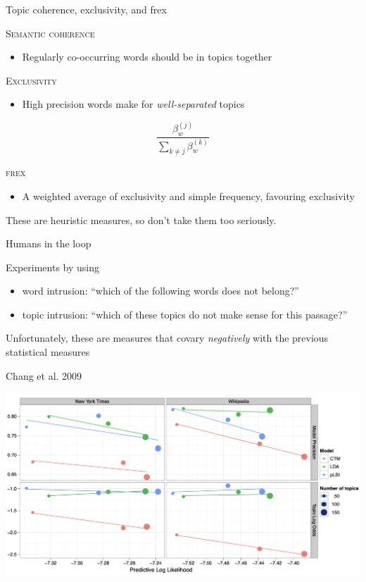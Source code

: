 \documentclass{hertieteaching}
\begin{document}
\begin{frame}{Topic coherence, exclusivity, and frex}

\textsc{Semantic coherence}

\begin{itemize}
  \item Regularly co-occurring words should be in  topics together
\end{itemize}

\textsc{Exclusivity}

\begin{itemize}
  \item High precision words make for \textit{well-separated} topics
\end{itemize}
$$
\frac{\beta_w^{(j)}}{\sum_{k\neq j} \beta_w^{(k)}}
$$

\textsc{frex}
\begin{itemize}
  \item A weighted average of exclusivity and simple frequency, favouring exclusivity
\end{itemize}


\medskip
These are heuristic measures, so don't take them too seriously.

\end{frame}

\begin{frame}{Humans in the loop}

Experiments by \textcite{Chang.etal2009} using
\begin{itemize}
  \item word intrusion: ``which of the following words does not belong?''
  \item topic intrusion: ``which of these topics do not make sense for this passage?''
\end{itemize}

Unfortunately, these are measures that covary \textit{negatively} with the previous statistical measures

\end{frame}

\begin{frame}{Chang et al. 2009}

\centerline{\includegraphics[scale=0.4]{pictures/chang2009}}

\end{frame}
\end{document}
